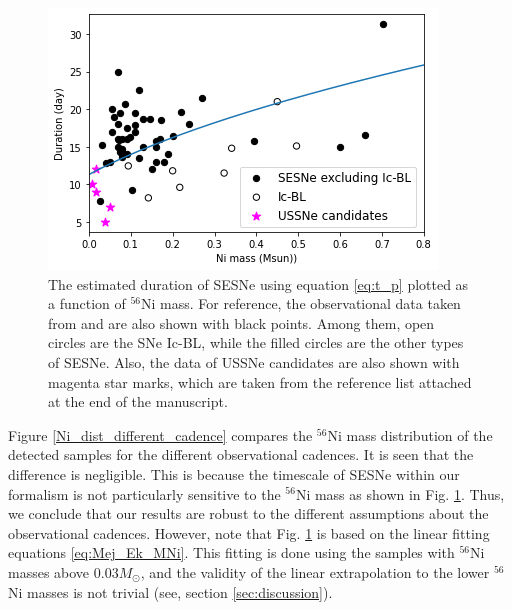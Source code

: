 \documentclass[twocolumn, linenumbers]{aastex62}
\begin{document}
\begin{figure}[htbp]
	\includegraphics[width=\columnwidth]{Ni_vs_tau.png}
    \caption{The estimated duration of SESNe using equation \ref{eq:t_p} plotted as a function of $^{56}$Ni mass. For reference, the observational data taken from \citet{2016MNRAS.457..328L} and \citet{2019MNRAS.485.1559P} are also shown with black points. Among them, open circles are the SNe Ic-BL, while the filled circles are the other types of SESNe. Also, the data of USSNe candidates are also shown with magenta star marks, which are taken from the reference list attached at the end of the manuscript.} 
     \label{Ni_vs_tau}
\end{figure}

Figure \ref{Ni_dist_different_cadence} compares the $^{56}$Ni mass distribution of the detected samples for the different observational cadences. It is seen that the difference is negligible.
This is because the timescale of SESNe within our formalism is not particularly sensitive to the $^{56}$Ni mass as shown in Fig. \ref{Ni_vs_tau}. Thus, we conclude that our results are robust to the different assumptions about the observational cadences. 
However, note that Fig. \ref{Ni_vs_tau} is based on the linear fitting equations \ref{eq:Mej_Ek_MNi}. This fitting is done using the samples with $^{56}$Ni masses above $0.03M_{\odot}$, and the validity of the linear extrapolation to the lower $^{56}$Ni masses is not trivial (see, section \ref{sec:discussion}).
\end{document}
